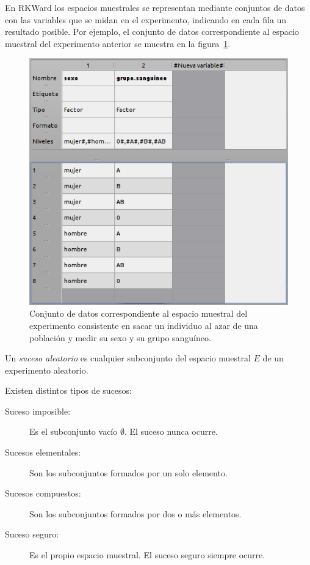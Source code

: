 En RKWard los espacios muestrales se representan mediante conjuntos de datos con las variables que se midan en el experimento, indicando
en cada fila un resultado posible. 
Por ejemplo, el conjunto de datos correspondiente al espacio muestral del experimento anterior se muestra en la
figura~\ref{g:espacio_muestral}.

\begin{figure}[htp]
\begin{center}
  \includegraphics[scale=0.6]{probabilidad/img/espacio_muestral}
  \caption{Conjunto de datos correspondiente al espacio muestral del experimento consistente en sacar un individuo al azar de una población
  y medir su sexo y su grupo sanguíneo.}
  \label{g:espacio_muestral}
\end{center}
\end{figure}

\begin{definicion}
Un \emph{suceso aleatorio} es cualquier subconjunto del espacio muestral $E$ de un experimento aleatorio. 
\end{definicion}

Existen distintos tipos de sucesos:
\begin{description}
\item[Suceso imposible:] Es el subconjunto vacío $\emptyset$. El suceso nunca ocurre.
\item[Sucesos elementales:] Son los subconjuntos formados por un solo elemento. 
\item[Sucesos compuestos:] Son los subconjuntos formados por dos o más elementos.
\item[Suceso seguro:] Es el propio espacio muestral. El suceso seguro siempre ocurre.
\end{description}

